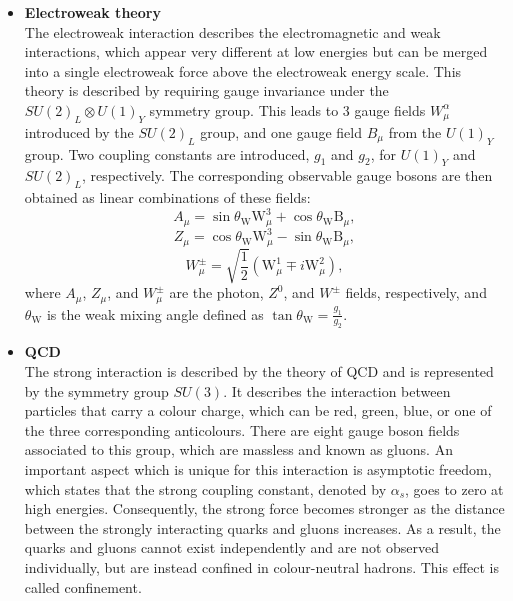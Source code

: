 \begin{itemize}
 \item[] \textbf{Electroweak theory}\\
 The electroweak interaction describes the electromagnetic and weak interactions, which appear very different at low energies but can be merged into a single electroweak force above the electroweak energy scale. This theory is described by requiring gauge invariance under the $SU(2)_L \otimes U(1)_Y$ symmetry group. This leads to 3 gauge fields $W_{\mu}^{\alpha}$ introduced by the $SU(2)_L$ group, and one gauge field $B_{\mu}$ from the $U(1)_Y$ group. Two coupling constants are introduced, $g_1$ and $g_2$, for $U(1)_Y$ and $SU(2)_L$, respectively. The corresponding observable gauge bosons are then obtained as linear combinations of these fields:
 \begin{equation}
  A_{\mu} = \sin\theta_{\mathrm{W}} \mathrm{W}^3_ {\mu} + \cos\theta_{\mathrm{W}}\mathrm{B}_{\mu},
 \end{equation}
 \begin{equation}
  Z_{\mu} = \cos\theta_{\mathrm{W}} \mathrm{W}^3_{\mu} - \sin\theta_{\mathrm{W}}\mathrm{B}_{\mu},
 \end{equation}
 \begin{equation}
  W_{\mu}^{\pm} = \sqrt{\frac{1}{2}}\left(\mathrm{W}^1_{\mu} \mp i\mathrm{W}^2_{\mu}\right),
 \end{equation}
 where $A_{\mu}$, $Z_{\mu}$, and $W_{\mu}^{\pm}$ are the photon, $Z^0$, and $W^{\pm}$ fields, respectively, and $\theta_{\mathrm{W}}$ is the weak mixing angle defined as $\tan\theta_{\mathrm{W}} = \frac{g_1}{g_2}$.

  \item[] \textbf{\ac{QCD}}\\
 The strong interaction is described by the theory of \acl{QCD} and is represented by the symmetry group $SU(3)$. It describes the interaction between particles that carry a colour charge, which can be red, green, blue, or one of the three corresponding anticolours. There are eight gauge boson fields associated to this group, which are massless and known as gluons. An important aspect which is unique for this interaction is asymptotic freedom, which states that the strong coupling constant, denoted by $\alpha_s$, goes to zero at high energies. Consequently, the strong force becomes stronger as the distance between the strongly interacting quarks and gluons increases. As a result, the quarks and gluons cannot exist independently and are not observed individually, but are instead confined in colour-neutral hadrons. This effect is called confinement.
\end{itemize}
  
